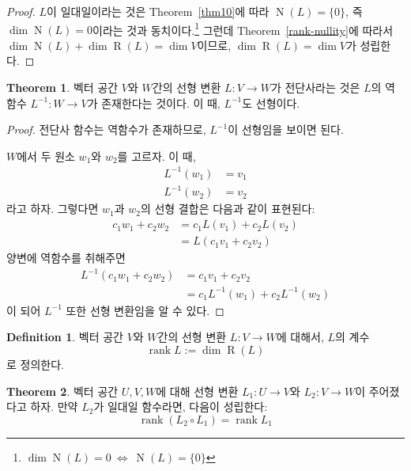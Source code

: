 \documentclass[unfonts,oneside,a4paper]{oblivoir}
\theoremstyle{definition}
\newtheorem{definition}{Definition}
\theoremstyle{theorem}
\newtheorem{theorem}{Theorem}
\theoremstyle{remark}
\theoremstyle{remark}
\theoremstyle{remark}
\theoremstyle{remark}
\renewcommand{\vec}[1]{\bm{\mathit{#1}}}
\newcommand{\vecz}{\bm{\mathrm{0}}}
\DeclareMathOperator{\Null}{N}
\DeclareMathOperator{\Range}{R}
\DeclareMathOperator{\rank}{rank}
\begin{document}
\begin{proof}
    $L$이 일대일이라는 것은 Theorem~\ref{thm10}에 따라 $\Null (L) = \{\vecz\}$, 즉 $\dim \Null (L) = 0$이라는 것과 동치이다.\footnote{$\dim \Null (L) = 0\ \Leftrightarrow\ \Null (L) = \{\vecz\}$}
    그런데 Theorem~\ref{rank-nullity}에 따라서 $\dim \Null (L) + \dim \Range (L) = \dim V$이므로, $\dim \Range(L) = \dim V$가 성립한다.
\end{proof}

\begin{theorem}
    벡터 공간 $V$와 $W$간의 선형 변환 $L: V \rightarrow W$가 전단사라는 것은 $L$의 역함수 $L^{-1}: W \rightarrow V$가 존재한다는 것이다.
    이 때, $L^{-1}$도 선형이다.
\end{theorem}

\begin{proof}
    전단사 함수는 역함수가 존재하므로, $L^{-1}$이 선형임을 보이면 된다.

    $W$에서 두 원소 $\vec w_1$와 $\vec w_2$를 고르자.
    이 때,
    \begin{align*}
        L^{-1}(\vec w_1) &= \vec v_1\\
        L^{-1}(\vec w_2) &= \vec v_2
    \end{align*}
    라고 하자.
    그렇다면 $\vec w_1$과 $\vec w_2$의 선형 결합은 다음과 같이 표현된다:
    \begin{align*}
        c_1 \vec w_1 + c_2 \vec w_2 &= c_1 L(\vec v_1) + c_2 L(\vec v_2)\\
                                &= L(c_1 \vec v_1 + c_2 \vec v_2)
    \end{align*}
    양변에 역함수를 취해주면
    \begin{align*}
        L^{-1}(c_1 \vec w_1 + c_2 \vec w_2) &= c_1 \vec v_1 + c_2 \vec v_2\\
                                     &= c_1 L^{-1}(\vec w_1) + c_2 L^{-1}(\vec w_2)
    \end{align*}
    이 되어 $L^{-1}$ 또한 선형 변환임을 알 수 있다.
\end{proof}

\begin{definition}
    벡터 공간 $V$와 $W$간의 선형 변환 $L: V \rightarrow W$에 대해서, $L$의 계수
    \begin{equation*}
        \rank L := \dim \Range(L)
    \end{equation*}
    로 정의한다.
\end{definition}

\begin{theorem}
    벡터 공간 $U, V, W$에 대해 선형 변환 $L_1: U \rightarrow V$와 $L_2: V \rightarrow W$이 주어졌다고 하자.
    만약 $L_2$가 일대일 함수라면, 다음이 성립한다:
    \begin{equation*}
        \rank (L_2 \circ L_1) = \rank L_1
    \end{equation*}
\end{theorem}
\end{document}
